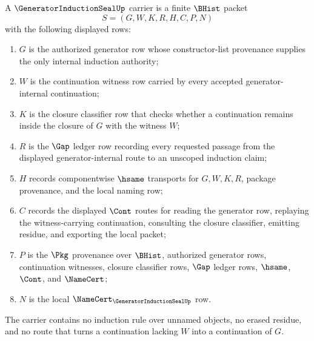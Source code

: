 \begin{definition}
\label{def:generator-induction-seal-carrier}
A $\GeneratorInductionSealUp$ carrier is a finite $\BHist$ packet
$$
S=(G,W,K,R,H,C,P,N)
$$
with the following displayed rows:
\begin{enumerate}
\item $G$ is the authorized generator row whose constructor-list provenance supplies the only internal induction authority;
\item $W$ is the continuation witness row carried by every accepted generator-internal continuation;
\item $K$ is the closure classifier row that checks whether a continuation remains inside the closure of $G$ with the witness $W$;
\item $R$ is the $\Gap$ ledger row recording every requested passage from the displayed generator-internal route to an unscoped induction claim;
\item $H$ records componentwise $\hsame$ transports for $G,W,K,R$, package provenance, and the local naming row;
\item $C$ records the displayed $\Cont$ routes for reading the generator row, replaying the witness-carrying continuation, consulting the closure classifier, emitting residue, and exporting the local packet;
\item $P$ is the $\Pkg$ provenance over $\BHist$, authorized generator rows, continuation witnesses, closure classifier rows, $\Gap$ ledger rows, $\hsame$, $\Cont$, and $\NameCert$;
\item $N$ is the local $\NameCert_{\GeneratorInductionSealUp}$ row.
\end{enumerate}
The carrier contains no induction rule over unnamed objects, no erased residue, and no route that turns a continuation lacking $W$ into a continuation of $G$.
\end{definition}

